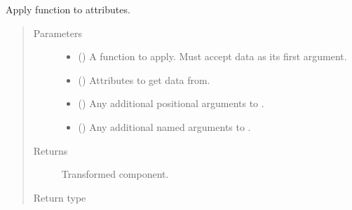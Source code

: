 \documentclass[letterpaper,10pt,english]{sphinxmanual}
\begin{document}
\begin{fulllineitems}
\begin{fulllineitems}
\end{fulllineitems}


\begin{fulllineitems}
\label{\detokenize{api/rock:geology.src.Rock.apply}}
Apply function to attributes.
\begin{quote}\begin{description}
\item[{Parameters}] \leavevmode\begin{itemize}
\item {} 
 () \textendash{} A function to apply. Must accept data as its first argument.

\item {} 
 (\sphinxstyleliteralemphasis{\sphinxupquote{, }}) \textendash{} Attributes to get data from.

\item {} 
 () \textendash{} Any additional positional arguments to .

\item {} 
 () \textendash{} Any additional named arguments to .

\end{itemize}

\item[{Returns}] \leavevmode
{} \textendash{} Transformed component.

\item[{Return type}] \leavevmode
{\hyperref[\detokenize{api/base_classes:geology.src.base_component.BaseComponent}]{}}

\end{description}\end{quote}


\end{fulllineitems}
\end{fulllineitems}
\end{document}
